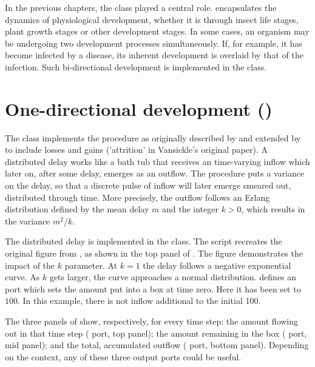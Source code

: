 In the previous chapters, the  class played a central role.  encapsulates the dynamics of physiological development, whether it is through insect life stages, plant growth stages or other development stages. In some cases, an organism may be undergoing two development processes simultaneously. If, for example, it has become infected by a disease, its inherent development is overlaid by that of the infection. Such bi-directional development is implemented in the  class.

\section{One-directional development ()}
\label{ch:physiological-development-stage}
The  class implements the  procedure as originally described by \citet{Manet76} and extended by \citet{Vansick77} to include losses and gains ('attrition' in Vansickle's original paper). A distributed delay works like a bath tub that receives an time-varying inflow which later on, after some delay, emerges as an outflow. The procedure puts a  variance on the delay, so that a discrete pulse of inflow will  later emerge smeared out, distributed through time. More precisely, the outflow follows an Erlang distribution defined by the mean delay $m$ and the integer $k>0$, which results in the variance $m^2$/$k$.

The distributed delay is implemented in the  class. The  script recreates the original figure from \citet{Manet76}, as shown in the top panel of . The figure demonstrates the impact of the $k$ parameter. At $k=1$ the delay follows a negative exponential curve. As $k$ gets larger, the curve approaches a normal distribution.  defines an  port which sets the amount put into a  box at time zero. Here it has been set to $100$. In this example, there is not inflow additional to the initial 100.

The three panels of  show, respectively, for every time step: the amount flowing out in that time step ( port, top panel); the amount remaining in the box ( port, mid panel); and the total, accumulated outflow ( port, bottom panel). Depending on the context, any of these three output ports could be useful.

